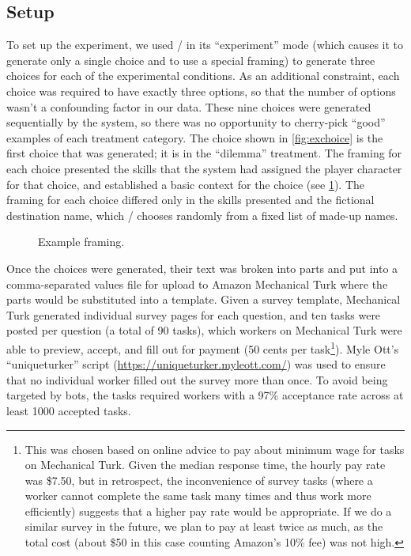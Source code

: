 \subsection{Setup}

To set up the experiment, we used \dunyazad/ in its ``experiment'' mode (which causes it to generate only a single choice and to use a special framing) to generate three choices for each of the experimental conditions.
%
As an additional constraint, each choice was required to have exactly three options, so that the number of options wasn't a confounding factor in our data.
%
These nine choices were generated sequentially by the system, so there was no opportunity to cherry-pick ``good'' examples of each treatment category.
%
The choice shown in \cref{fig:exchoice} is the first choice that was generated; it is in the ``dilemma'' treatment.
%
The framing for each choice presented the skills that the system had assigned the player character for that choice, and established a basic context for the choice (see \cref{fig:exframing}).
%
The framing for each choice differed only in the skills presented and the fictional destination name, which \dunyazad/ chooses randomly from a fixed list of made-up names.


\begin{figure}[!h]
\centering
{}
  \caption{Example framing.}
  \label{fig:exframing}
\end{figure}


Once the choices were generated, their text was broken into parts and put into a comma-separated values file for upload to Amazon Mechanical Turk where the parts would be substituted into a template.
%
Given a survey template, Mechanical Turk generated individual survey pages for each question, and ten tasks were posted per question (a total of 90 tasks), which workers on Mechanical Turk were able to preview, accept, and fill out for payment (50 cents per task\footnote{This was chosen based on online advice to pay about minimum wage for tasks on Mechanical Turk. Given the median response time, the hourly pay rate was \$7.50, but in retrospect, the inconvenience of survey tasks (where a worker cannot complete the same task many times and thus work more efficiently) suggests that a higher pay rate would be appropriate. If we do a similar survey in the future, we plan to pay at least twice as much, as the total cost (about \$50 in this case counting Amazon's 10\% fee) was not high.}).
%
Myle Ott's ``uniqueturker'' script (\url{https://uniqueturker.myleott.com/}) was used to ensure that no individual worker filled out the survey more than once.
%
To avoid being targeted by bots, the tasks required workers with a 97\% acceptance rate across at least 1000 accepted tasks.

